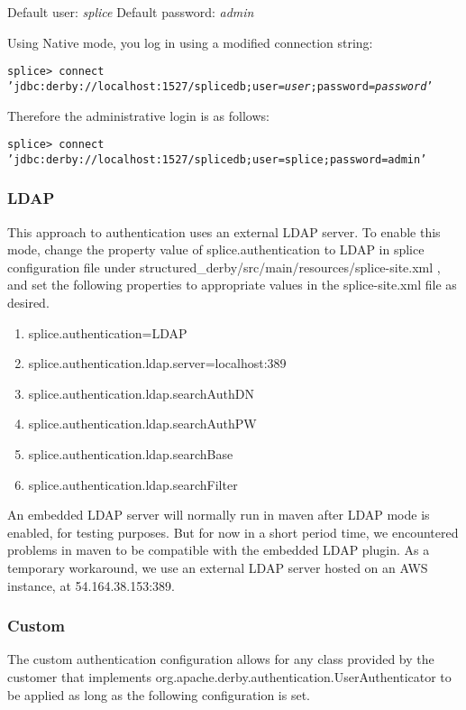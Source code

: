 \documentclass{article}
\begin{document}
Default user:  \emph{splice}	
Default password: \emph{admin}

Using Native mode, you log in using a modified connection string:

\texttt{splice> connect 'jdbc:derby://localhost:1527/splicedb;user=\emph{user};password=\emph{password}'}

Therefore the administrative login is as follows:

\texttt{splice> connect 'jdbc:derby://localhost:1527/splicedb;user=splice;password=admin'}




\subsubsection{LDAP}
This approach to authentication uses an external LDAP server. To enable this mode, change the property value of splice.authentication to LDAP in splice configuration file under structured_derby/src/main/resources/splice-site.xml , and set the following properties to appropriate values in the splice-site.xml file as desired. 
\begin{enumerate}
	\item splice.authentication=LDAP
	\item splice.authentication.ldap.server=localhost:389
	\item splice.authentication.ldap.searchAuthDN
	\item splice.authentication.ldap.searchAuthPW
	\item splice.authentication.ldap.searchBase
	\item splice.authentication.ldap.searchFilter
\end{enumerate}

An embedded LDAP server will normally run in maven after LDAP mode is enabled, for testing purposes. But for now in a short period time, we encountered problems in maven to be compatible with the embedded LDAP plugin. As a temporary workaround, we use an external LDAP server hosted on an AWS instance, at 54.164.38.153:389. 

\subsubsection{Custom}

The custom authentication
configuration allows for any
class provided by the customer
that implements org.apache.derby.authentication.UserAuthenticator
to be applied as long as the following configuration is set.
\end{document}

